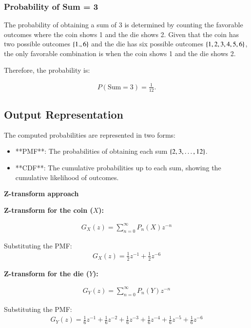 \documentclass[journal]{IEEEtran}
\begin{document}
\subsubsection*{Probability of Sum = 3}
The probability of obtaining a sum of 3 is determined by counting the favorable outcomes where  the coin shows 1 and the die shows 2. Given that the coin has two possible outcomes $\left\{1.,6\right\}$ and the die has six possible outcomes $\left\{1,2,3,4,5,6\right\}$, the only favorable combination is when the coin shows 1 and the die shows 2.

Therefore, the probability is:

\begin{align}
    P(\text{Sum} = 3) = \frac{1}{12}.
\end{align}


\subsection*{Output Representation}
The computed probabilities are represented in two forms:
\begin{itemize}
    \item **PMF**: The probabilities of obtaining each sum $\left\{2, 3, \ldots, 12\right\}$.
    \item **CDF**: The cumulative probabilities up to each sum, showing the cumulative likelihood of outcomes.
\end{itemize}
\textbf{Z-transform approach}

\textbf{Z-transform for the coin (\(X\)):}

\begin{align}
    G_X(z) = \sum_{n=0}^\infty P_n(X) z^{-n}
\end{align}



Substituting the PMF:
\begin{align}
    G_X(z) = \frac{1}{2}z^{-1} + \frac{1}{2}z^{-6}
\end{align}

\textbf{Z-transform for the die (\(Y\)):}

\begin{align}
    G_Y(z) = \sum_{n=0}^\infty P_n(Y) z^{-n}
\end{align}

Substituting the PMF:
\begin{align}
   G_Y(z) = \frac{1}{6}z^{-1} + \frac{1}{6}z^{-2} + \frac{1}{6}z^{-3} + \frac{1}{6}z^{-4} + \frac{1}{6}z^{-5} + \frac{1}{6}z^{-6} 
\end{align}
\end{document}
